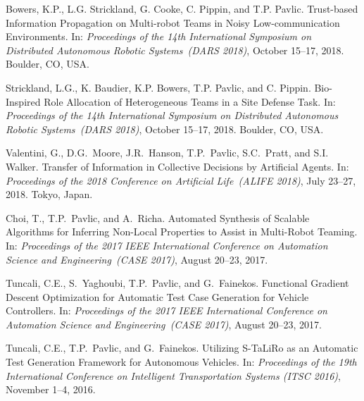 \documentclass[10pt]{article}
\begin{document}
\begin{bibenum}
    \item Bowers, K.P., L.G. Strickland, G. Cooke, C. Pippin, and T.P.
        Pavlic. Trust-based Information Propagation on Multi-robot Teams
        in Noisy Low-communication Environments. In: \emph{Proceedings of the
        14th International Symposium on Distributed Autonomous Robotic
        Systems~(DARS 2018)}, October 15--17, 2018. Boulder, CO, USA.

    \item Strickland, L.G., K. Baudier, K.P. Bowers, T.P. Pavlic, and C.
        Pippin. Bio-Inspired Role Allocation of Heterogeneous Teams in a
        Site Defense Task. In: \emph{Proceedings of the 14th
            International Symposium on Distributed Autonomous Robotic
        Systems~(DARS 2018)}, October 15--17, 2018. Boulder, CO, USA.

    \item Valentini, G., D.G.~Moore, J.R.~Hanson, T.P.~Pavlic,
        S.C.~Pratt, and S.I. Walker. Transfer of Information in
        Collective Decisions by Artificial Agents. In: \emph{Proceedings
        of the 2018 Conference on Artificial Life~(ALIFE 2018)}, July
        23--27, 2018. Tokyo, Japan.

    \item Choi, T., T.P.~Pavlic, and A.~Richa. Automated
        Synthesis of Scalable Algorithms for Inferring Non-Local
        Properties to Assist in Multi-Robot Teaming. In:
        \emph{Proceedings of the 2017 IEEE International Conference on
        Automation Science and Engineering~(CASE 2017)},
        August 20--23, 2017. %

    \item Tuncali, C.E., S.~Yaghoubi, T.P.~Pavlic, and G.~Fainekos.
        Functional Gradient Descent Optimization for Automatic Test Case
        Generation for Vehicle Controllers. In:
        \emph{Proceedings of the 2017 IEEE International Conference on
        Automation Science and Engineering~(CASE 2017)},
        August 20--23, 2017. %

    \item Tuncali, C.E., T.P.~Pavlic, and G.~Fainekos. Utilizing
        S-TaLiRo as an Automatic Test Generation Framework for
        Autonomous Vehicles. In: \emph{Proceedings of the 19th
        International Conference on Intelligent Transportation
        Systems (ITSC 2016)}, November 1--4, 2016.\\


\end{bibenum}
\end{document}
